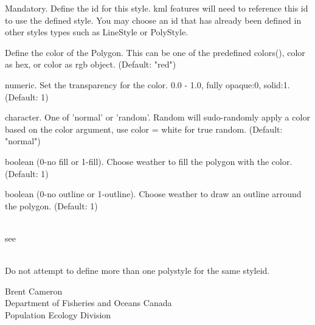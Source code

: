 \documentclass[a4paper]{book}
\begin{document}
\begin{Arguments}
\begin{ldescription}

\item[\code{styleid}] 
Mandatory. Define the id for this style. kml features will need to reference this id to use the defined style. You may choose an id that has already been defined in other styles types such as LineStyle or PolyStyle.



\item[\code{color}] Define the color of the Polygon. This can be one of the predefined colors(), color as hex, or color as rgb object. (Default: "red")
\item[\code{transparency}] numeric. Set the transparency for the color. 0.0 - 1.0, fully opaque:0, solid:1. (Default: 1)
\item[\code{colorMode}] character. One of 'normal' or 'random'. Random will sudo-randomly apply a color based on the color argument, use color = white for true random. (Default: "normal")
\item[\code{fill}] boolean (0-no fill or 1-fill). Choose weather to fill the polygon with the color. (Default: 1)
\item[\code{outline}] boolean (0-no outline or 1-outline). Choose weather to draw an outline arround the polygon. (Default: 1)

\end{ldescription}
\end{Arguments}
%
\begin{Note}\relax
{}\\{}
see 
\\{}

\\{}
Do not attempt to define more than one polystyle for the same styleid.

\end{Note}
%
\begin{Author}\relax
Brent Cameron\\{}
Department of Fisheries and Oceans Canada\\{}
Population Ecology Division
\end{Author}
%
\begin{References}\relax
{}
\end{References}
\end{document}
